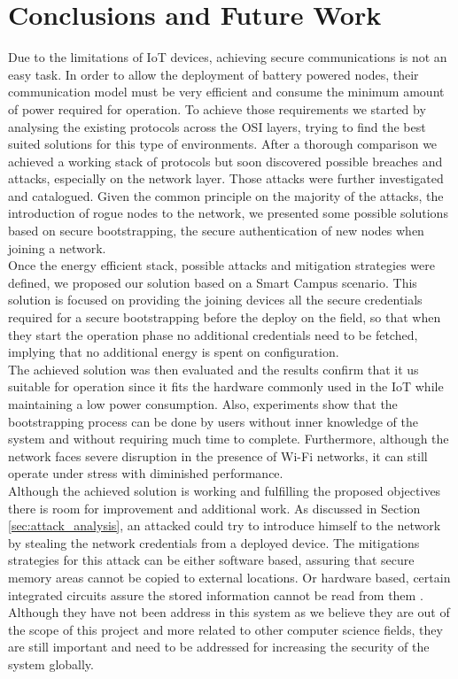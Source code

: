 
\chapter{Conclusions and Future Work}
\label{chapter:conclusion}
Due to the limitations of \gls{IoT} devices, achieving secure communications is not an easy task. In order to allow the deployment of battery powered nodes, their communication model must be very efficient and consume the minimum amount of power required for operation. To achieve those requirements we started by analysing the existing protocols across the OSI layers, trying to find the best suited solutions for this type of environments. After a thorough comparison we achieved a working stack of protocols but soon discovered possible breaches and attacks, especially on the network layer. Those attacks were further investigated and catalogued. Given the common principle on the majority of the attacks, the introduction of rogue nodes to the network, we presented some possible solutions based on secure bootstrapping, the secure authentication of new nodes when joining a network.\\
Once the energy efficient stack, possible attacks and mitigation strategies were defined, we proposed our solution based on a Smart Campus scenario. This solution is focused on providing the joining devices all the secure credentials required for a secure bootstrapping before the deploy on the field, so that when they start the operation phase no additional credentials need to be fetched, implying that no additional energy is spent on configuration.\\
The achieved solution was then evaluated and the results confirm that it us suitable for operation since it fits the hardware commonly used in the \gls{IoT} while maintaining a low power consumption. Also, experiments show that the bootstrapping process can be done by users without inner knowledge of the system and without requiring much time to complete. Furthermore, although the network faces severe disruption in the presence of Wi-Fi networks, it can still operate under stress with diminished performance.\\
Although the achieved solution is working and fulfilling the proposed objectives there is room for improvement and additional work. As discussed in Section \ref{sec:attack_analysis}, an attacked could try to introduce himself to the network by stealing the network credentials from a deployed device. The mitigations strategies for this attack can be either software based,  assuring that secure memory areas cannot be copied to external locations. Or hardware based, certain integrated circuits assure the stored information cannot be read from them \cite{Lesjak2014}. Although they have not been address in this system as we believe they are out of the scope of this project and more related to other computer science fields, they are still important and need to be addressed for increasing the security of the system globally. 
